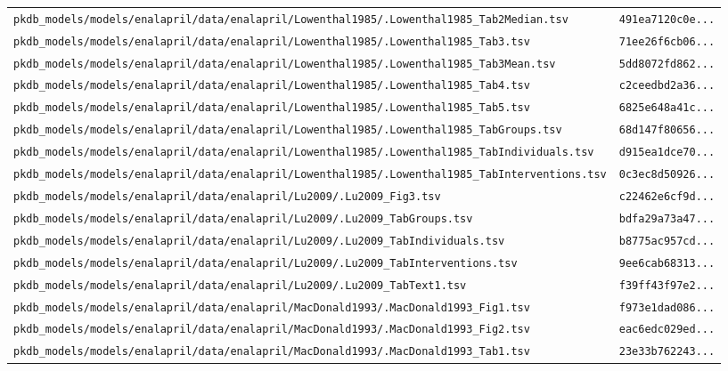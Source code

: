 \documentclass{article}
\begin{document}
\begin{longtable}{ll}
\texttt{pkdb\_models/models/enalapril/data/enalapril/Lowenthal1985/.Lowenthal1985\_Tab2Median.tsv} & \texttt{491ea7120c0e...} \\
\texttt{pkdb\_models/models/enalapril/data/enalapril/Lowenthal1985/.Lowenthal1985\_Tab3.tsv} & \texttt{71ee26f6cb06...} \\
\texttt{pkdb\_models/models/enalapril/data/enalapril/Lowenthal1985/.Lowenthal1985\_Tab3Mean.tsv} & \texttt{5dd8072fd862...} \\
\texttt{pkdb\_models/models/enalapril/data/enalapril/Lowenthal1985/.Lowenthal1985\_Tab4.tsv} & \texttt{c2ceedbd2a36...} \\
\texttt{pkdb\_models/models/enalapril/data/enalapril/Lowenthal1985/.Lowenthal1985\_Tab5.tsv} & \texttt{6825e648a41c...} \\
\texttt{pkdb\_models/models/enalapril/data/enalapril/Lowenthal1985/.Lowenthal1985\_TabGroups.tsv} & \texttt{68d147f80656...} \\
\texttt{pkdb\_models/models/enalapril/data/enalapril/Lowenthal1985/.Lowenthal1985\_TabIndividuals.tsv} & \texttt{d915ea1dce70...} \\
\texttt{pkdb\_models/models/enalapril/data/enalapril/Lowenthal1985/.Lowenthal1985\_TabInterventions.tsv} & \texttt{0c3ec8d50926...} \\
\texttt{pkdb\_models/models/enalapril/data/enalapril/Lu2009/.Lu2009\_Fig3.tsv} & \texttt{c22462e6cf9d...} \\
\texttt{pkdb\_models/models/enalapril/data/enalapril/Lu2009/.Lu2009\_TabGroups.tsv} & \texttt{bdfa29a73a47...} \\
\texttt{pkdb\_models/models/enalapril/data/enalapril/Lu2009/.Lu2009\_TabIndividuals.tsv} & \texttt{b8775ac957cd...} \\
\texttt{pkdb\_models/models/enalapril/data/enalapril/Lu2009/.Lu2009\_TabInterventions.tsv} & \texttt{9ee6cab68313...} \\
\texttt{pkdb\_models/models/enalapril/data/enalapril/Lu2009/.Lu2009\_TabText1.tsv} & \texttt{f39ff43f97e2...} \\
\texttt{pkdb\_models/models/enalapril/data/enalapril/MacDonald1993/.MacDonald1993\_Fig1.tsv} & \texttt{f973e1dad086...} \\
\texttt{pkdb\_models/models/enalapril/data/enalapril/MacDonald1993/.MacDonald1993\_Fig2.tsv} & \texttt{eac6edc029ed...} \\
\texttt{pkdb\_models/models/enalapril/data/enalapril/MacDonald1993/.MacDonald1993\_Tab1.tsv} & \texttt{23e33b762243...} \\

\end{longtable}
\end{document}
